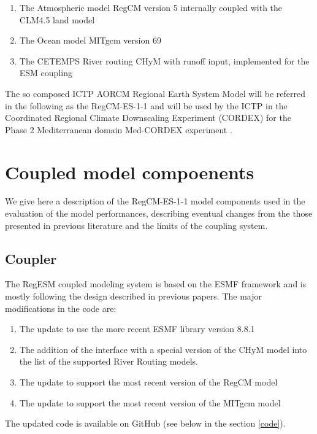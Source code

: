 \documentclass[journal abbreviation, manuscript]{copernicus}
\begin{document}
\begin{enumerate}
    \item The Atmospheric model RegCM version 5 \citep{giorgi-2023}
        internally coupled with the CLM4.5 land model \citep{oleson-2013}
    \item The Ocean model MITgcm version 69 \citep{marshall-1997,adcroft-2004}
    \item The CETEMPS River routing CHyM with runoff input, implemented
        for the ESM coupling \citep{coppola-2007}
\end{enumerate}

The so composed ICTP AORCM Regional Earth System Model will be referred in the
following as the RegCM-ES-1-1 and will be used by the ICTP in
the Coordinated Regional Climate Downscaling Experiment (CORDEX) for the
Phase 2 Mediterranean domain Med-CORDEX experiment \citep{somot-2020}.

\section{Coupled model compoenents}

We give here a description of the RegCM-ES-1-1 model components used in the
evaluation of the model performances, describing eventual changes from the
those presented in previous literature and the limits of the coupling
system.

\subsection{Coupler}

The RegESM coupled modeling system is based on the ESMF framework and is
mostly following the design described in previous papers. The major
modifications in the code are:

\begin{enumerate}
    \item The update to use the more recent ESMF library version 8.8.1
    \item The addition of the interface with a special version of the CHyM
        model into the list of the supported River Routing models.
    \item The update to support the most recent version of the RegCM model
    \item The update to support the most recent version of the MITgcm model
\end{enumerate}

The updated code is available on GitHub (see below in the section \ref{code}).
\end{document}

